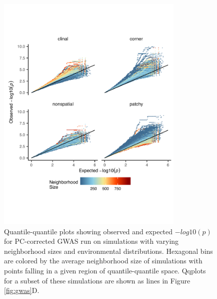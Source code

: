 \documentclass[10pt,twoside,lineno,hidelinks]{preprint}
\begin{document}
\begin{figure}[p]
\centering
\includegraphics[width=0.8\textwidth]{figures/qqplots_hexbin.pdf}
\caption{Quantile-quantile plots showing observed and expected $-log10(p)$ for PC-corrected GWAS run on simulations with varying neighborhood sizes and environmental distributions. Hexagonal bins are colored by the average neighborhood size of simulations with points falling in a given region of quantile-quantile space. Qqplots for a subset of these simulations are shown as lines in Figure \ref{fig:gwas}D.} 
\label{fig:qqplot_hexbins}
\end{figure}
\FloatBarrier
\end{document}
